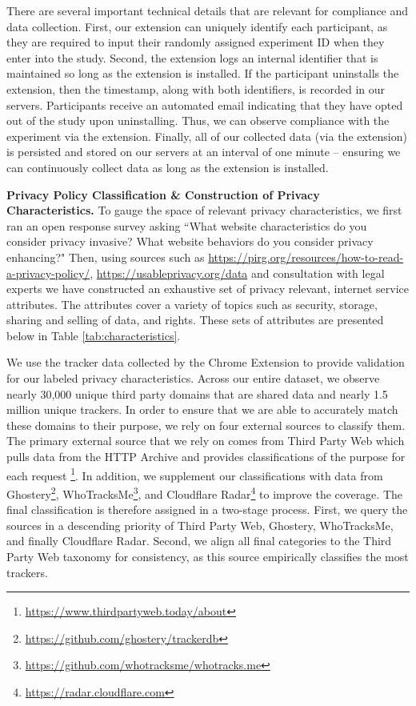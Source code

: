 \documentclass[12pt]{article}
\theoremstyle{definition}
\theoremstyle{remark}
\begin{document}
\begin{appendix}
There are several important technical details that are relevant for compliance and data collection. First, our extension can uniquely identify each participant, as they are required to input their randomly assigned experiment ID when they enter into the study. Second, the extension logs an internal identifier that is maintained so long as the extension is installed. If the participant uninstalls the extension, then the timestamp, along with both identifiers, is recorded in our servers. Participants receive an automated email indicating that they have opted out of the study upon uninstalling. Thus, we can observe compliance with the experiment via the extension. Finally, all of our collected data (via the extension) is persisted and stored on our servers at an interval of one minute -- ensuring we can continuously collect data as long as the extension is installed.

\vspace{0.5cm}

\noindent \textbf{Privacy Policy Classification \& Construction of Privacy Characteristics.} To gauge the space of relevant privacy characteristics, we first ran an open response survey asking ``What website characteristics do you consider privacy invasive? What website behaviors do you consider privacy enhancing?" Then, using sources such as \url{https://pirg.org/resources/how-to-read-a-privacy-policy/},  \url{ https://usableprivacy.org/data} and consultation with legal experts we have constructed an exhaustive set of privacy relevant, internet service attributes. The attributes cover a variety of topics such as security, storage, sharing and selling of data, and rights. These sets of attributes are presented below in Table \ref{tab:characteristics}.

We use the tracker data collected by the Chrome Extension to provide validation for our labeled privacy characteristics. Across our entire dataset, we observe nearly 30,000 unique third party domains that are shared data and nearly 1.5 million unique trackers. %
In order to ensure that we are able to accurately match these domains to their purpose, we rely on four external sources to classify them. The primary external source that we rely on comes from Third Party Web which pulls data from the HTTP Archive and provides classifications of the purpose for each request \footnote{\url{https://www.thirdpartyweb.today/about}}. In addition, we supplement our classifications with data from Ghostery\footnote{\url{ https://github.com/ghostery/trackerdb}}, WhoTracksMe\footnote{\url{https://github.com/whotracksme/whotracks.me}}, and Cloudflare Radar\footnote{\url{https://radar.cloudflare.com}} to improve the coverage. The final classification is therefore assigned in a two-stage process. First, we query the sources in a descending priority of Third Party Web, Ghostery, WhoTracksMe, and finally Cloudflare Radar. Second, we align all final categories to the Third Party Web taxonomy for consistency, as this source empirically classifies the most trackers.


\end{appendix}
\end{document}

